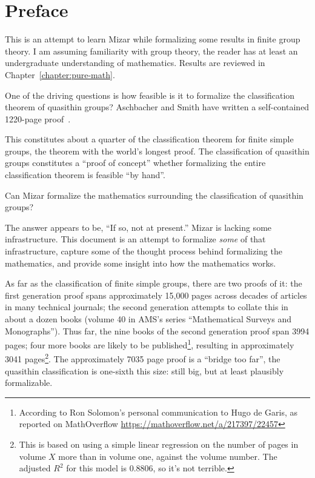 \chapter{Preface}

\M
This is an attempt to learn Mizar while formalizing some results in
finite group theory. I am assuming familiarity with group theory, the
reader has at least an undergraduate understanding of mathematics.
Results are reviewed in Chapter~\ref{chapter:pure-math}.

One of the driving questions is how feasible is it to formalize the
classification theorem of quasithin groups? Aschbacher and Smith have
written a self-contained 1220-page
proof~\cite{aschbacher2004classification1,aschbacher2004classification2}.

This constitutes about a quarter of the classification theorem for
finite simple groups, the theorem with the world's longest proof. The
classification of quasithin groups constitutes a ``proof of concept''
whether formalizing the entire classification theorem is feasible ``by hand''.

\M
Can Mizar formalize the mathematics surrounding the classification of
quasithin groups?

The answer appears to be, ``If so, not at present.'' Mizar is lacking
some infrastructure. This document is an attempt to formalize
\emph{some} of that infrastructure, capture some of the thought process
behind formalizing the mathematics, and provide some insight into how
the mathematics works.

\M As far as the classification of finite simple groups, there are two
proofs of it: the first generation proof spans approximately {15,000}
pages across decades of articles in many technical journals; the second
generation attempts to collate this in about a dozen books (volume 40 in
AMS's series ``Mathematical Surveys and Monographs''). Thus far, the
nine books of the second generation proof span 3994 pages; four more
books are likely to be published\footnote{According to Ron Solomon's
personal communication to Hugo de Garis, as reported on MathOverflow \url{https://mathoverflow.net/a/217397/22457}}, resulting in approximately 3041
pages\footnote{This is based on using a simple linear regression on the
number of pages in volume $X$ more than in volume one, against the
volume number. The adjusted $R^{2}$ for this model is $0.8806$, so it's
not terrible.}. The approximately 7035 page proof is a ``bridge too
far'', the quasithin classification is one-sixth this size: still big,
but at least plausibly formalizable.

